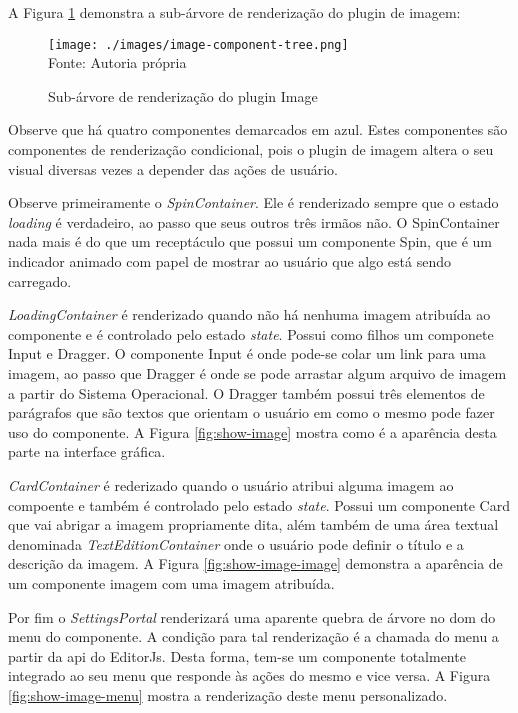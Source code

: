 
A
Figura \ref{fig:image-component-tree}
demonstra a sub-árvore de renderização do plugin de imagem:

\begin{figure}[H]
    \centering
    \caption{Sub-árvore de renderização do plugin Image}
    \texttt{[image: ./images/image-component-tree.png]}
    \label{fig:image-component-tree} \\
    \textnormal{\fontsize{10pt}{12pt}Fonte: Autoria própria}
\end{figure}

Observe que há quatro componentes demarcados em azul. Estes componentes
são componentes de renderização condicional, pois o plugin de imagem
altera o seu visual diversas vezes a depender das ações de usuário.

Observe primeiramente o \textit{SpinContainer}. Ele é renderizado sempre que
o estado \textit{loading} é verdadeiro, ao passo que seus outros três irmãos não.
O SpinContainer nada mais é do que um receptáculo que possui um componente
Spin, que é um indicador animado com papel de mostrar ao usuário que algo está
sendo carregado.

\textit{LoadingContainer} é renderizado quando não há nenhuma imagem atribuída ao componente
e é controlado pelo estado \textit{state}. Possui como filhos um componete Input e Dragger.
O componente Input é onde pode-se colar um link para uma imagem, ao passo que Dragger é
onde se pode arrastar algum arquivo de imagem a partir do Sistema Operacional. O Dragger
também possui três elementos de parágrafos que são textos que orientam o usuário em como
o mesmo pode fazer uso do componente. A
Figura \ref{fig:show-image}
mostra como é a aparência desta parte na interface gráfica.

\textit{CardContainer} é rederizado quando o usuário atribui alguma imagem ao compoente e também
é controlado pelo estado \textit{state}.
Possui um componente Card que vai abrigar a imagem propriamente dita, além também de uma área
textual denominada \textit{TextEditionContainer} onde o usuário pode definir o título e a descrição
da imagem. A
Figura \ref{fig:show-image-image}
demonstra a aparência de um componente imagem com uma imagem atribuída.

Por fim o \textit{SettingsPortal} renderizará uma aparente quebra de árvore no
\acrshort{dom}
do menu do componente. A condição para tal renderização é a chamada do menu
a partir da
\acrshort{api}
do EditorJs. Desta forma, tem-se um componente totalmente integrado ao seu
menu que responde às ações do mesmo e vice versa.
A
Figura \ref{fig:show-image-menu}
mostra a renderização deste menu personalizado.

